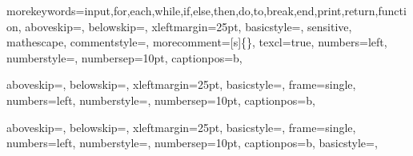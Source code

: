 \newcommand{\INPUT}{\textbf{Input}}
\newcommand{\as}{\ensuremath{\leftarrow}}




%
{morekeywords={input,for,each,while,if,else,then,do,to,break,end,print,return,function},%
  aboveskip=\smallskipamount,
  belowskip=\smallskipamount,
  xleftmargin=25pt,         
  basicstyle=\footnotesize,	%
  sensitive,%
  mathescape,%
  commentstyle=\footnotesize\upshape,%
  morecomment=[s]{\{}{\}},%
  texcl=true,			%
  numbers=left,			%
  numberstyle=\tiny,		%
  numbersep=10pt,		%
  captionpos=b,		        %
 }


%
{
  aboveskip=\smallskipamount,
  belowskip=\smallskipamount,
  xleftmargin=25pt,         
  basicstyle=\footnotesize\ttfamily,	%
  frame=single,			%
  numbers=left,			%
  numberstyle=\tiny,		%
  numbersep=10pt,		%
  captionpos=b,		        %
}
%
{
}


%
{
  aboveskip=\smallskipamount,
  belowskip=\smallskipamount,
  xleftmargin=25pt,         
  basicstyle=\footnotesize\ttfamily,	%
  frame=single,			%
  numbers=left,			%
  numberstyle=\tiny,		%
  numbersep=10pt,		%
  captionpos=b,		        %
}
%
{
  basicstyle=\footnotesize\ttfamily,	%
}



